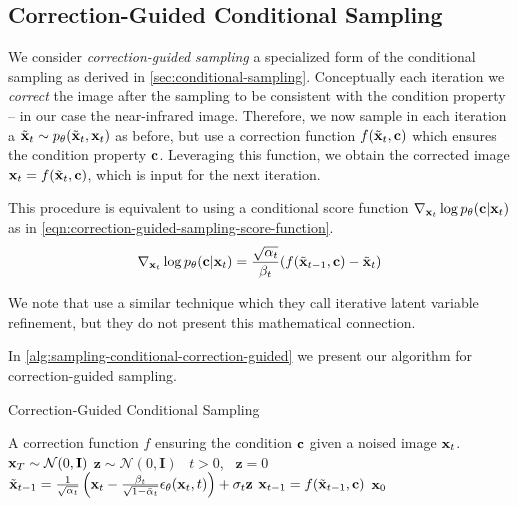 \subsection{Correction-Guided Conditional Sampling}
\label{sec:correction-guided-sampling}

We consider \textit{correction-guided sampling} a specialized form of the conditional sampling as derived in \autoref{sec:conditional-sampling}.
Conceptually each iteration we \textit{correct} the image after the sampling to be consistent with the condition property -- in our case the near-infrared image.
Therefore, we now sample in each iteration a $\tilde{\mathbf{x}}_t \sim p_\theta(\tilde{\mathbf{x}}_t, \mathbf{x}_{t})$ as before, but use a correction function $f(\tilde{\mathbf{x}}_t, \mathbf{c})$ which ensures the condition property $\mathbf{c}$.
Leveraging this function, we obtain the corrected image $\mathbf{x}_t = f(\tilde{\mathbf{x}}_t, \mathbf{c})$, which is input for the next iteration. 

This procedure is equivalent to using a conditional score function $\nabla_{\mathbf{x}_t}\log p_\theta(\mathbf{c} | \mathbf{x}_{t})$ as in \autoref{eqn:correction-guided-sampling-score-function}.
\begin{equation}
   \label{eqn:correction-guided-sampling-score-function}
   \nabla_{\mathbf{x}_t}\log p_\theta(\mathbf{c} | \mathbf{x}_{t}) = \frac{\sqrt{\alpha_t}}{\beta_t}(f(\tilde{\mathbf{x}}_{t-1}, \mathbf{c}) - \tilde{\mathbf{x}}_t) 
\end{equation}

We note that \textcite{ilvr} use a similar technique which they call iterative latent variable refinement, but they do not present this mathematical connection. 

In \autoref{alg:sampling-conditional-correction-guided} we present our algorithm for correction-guided sampling.

\begin{algorithm}[htp!]
   \caption{Correction-Guided Conditional Sampling}
   \label{alg:sampling-conditional-correction-guided}
   \begin{algorithmic}
      \Require A correction function $f$ ensuring the condition $\mathbf{c}$ given a noised image $\mathbf{x}_t$.
      \State $\mathbf{x}_T \sim \mathcal{N}(0, \mathbf{I})$
      \State $\mathbf{z} \sim \mathcal{N}(0, \mathbf{I})$ \algorithmicif\ $t > 0$, \algorithmicelse\ $\mathbf{z} = 0$
      \State $\tilde{\mathbf{x}}_{t-1} = \frac{1}{\sqrt{\alpha_t}} \left(\mathbf{x}_t - \frac{\beta_t}{\sqrt{1 - \bar{\alpha}_t}} \epsilon_\theta(\mathbf{x}_t, t) \right) + \sigma_t \mathbf{z}$
      \State $\mathbf{x}_{t-1} = f(\tilde{\mathbf{x}}_{t-1}, \mathbf{c})$
      \EndFor
      \Return $\mathbf{x}_0$
   \end{algorithmic}
\end{algorithm}

